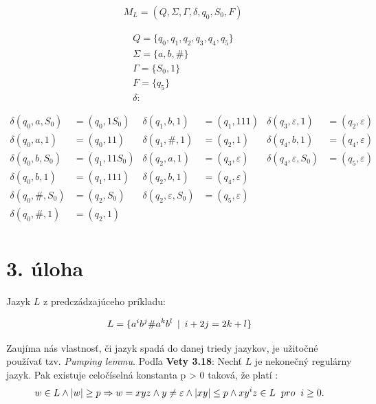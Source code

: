 \documentclass[11pt,a4paper]{article}
\begin{document}
\begin{align*}
    & M_L = (Q, \Sigma, \Gamma, \delta, q_0, S_0, F)
\end{align*}


\begin{align*}
    & Q = \{q_0, q_1, q_2, q_3, q_4, q_5\} \\
    & \Sigma = \{a, b, \# \} \\
    & \Gamma = \{S_0, 1 \} \\
    & F = \{ q_5 \} \\
    & \delta:
\end{align*}

\begin{align*}
    \delta(q_0, a, S_0) &= (q_0, 1S_0)  & \delta(q_1, b, 1)             &= (q_1, 111)         & \delta(q_3, \varepsilon, 1)   &= (q_2, \varepsilon) \\
    \delta(q_0, a, 1)   &= (q_0, 11)    & \delta(q_1, \#, 1)            &= (q_2, 1)           & \delta(q_4, b, 1)             &= (q_4, \varepsilon) \\
    \delta(q_0, b, S_0) &= (q_1, 11S_0) & \delta(q_2, a, 1)             &= (q_3, \varepsilon) & \delta(q_4, \varepsilon, S_0) &= (q_5, \varepsilon) \\
    \delta(q_0, b, 1)   &= (q_1, 111)   & \delta(q_2, b, 1)             &= (q_4, \varepsilon) \\
    \delta(q_0, \#, S_0)&= (q_2, S_0)   & \delta(q_2, \varepsilon, S_0) &= (q_5, \varepsilon) \\
    \delta(q_0, \#, 1)  &= (q_2, 1)     \\
\end{align*}


\newpage
\section{3. úloha}

Jazyk $L$ z predczádzajúceho príkladu:

\begin{equation}
L = \{a^i b^j \# a^k b^l \hspace{0.17cm}|\hspace{0.17cm} i + 2j = 2k + l\}
\end{equation}

Zaujíma nás vlastnosť, či jazyk spadá do danej triedy jazykov, je užitočné používať tzv. \textit{Pumping lemmu}.
Podľa \textbf{Vety 3.18}: Nechť $L$ je nekonečný regulárny jazyk. Pak existuje celočíselná konstanta \hspace{1cm}p > 0 taková, že platí \cite{AA}:
\begin{equation}
w \in L \land  |w| \ge p \Rightarrow w = x y z \land y \ne \varepsilon \land |xy| \le p \land x y^i z \in L \hspace{0.2cm} pro\hspace{0.2cm} i \ge 0.
\end{equation}
\end{document}
